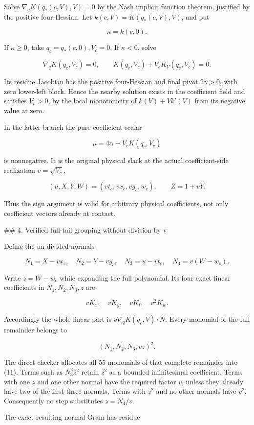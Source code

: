 Solve \(
\nabla_qK(q_*(c,V),V)=0
\) by the Nash implicit function theorem, justified by the positive
four-Hessian. Let \(k(c,V)=K(q_*(c,V),V)\), and put

\[
\kappa=k(c,0).
\]

If \(\kappa\ge0\), take \(q_c=q_*(c,0),V_c=0\). If \(\kappa<0\), solve

\[
\nabla_qK(q_c,V_c)=0,\qquad
K(q_c,V_c)+V_c K_V(q_c,V_c)=0.
\tag{8}
\]

Its residue Jacobian has the positive four-Hessian and final pivot
\(2\gamma>0\), with zero lower-left block. Hence the nearby solution
exists in the coefficient field and satisfies \(V_c>0\), by the local
monotonicity of \(k(V)+Vk'(V)\) from its negative value at zero.

In the latter branch the pure coefficient scalar

\[
\mu=4\alpha+V_cK(q_c,V_c)
\tag{9}
\]

is nonnegative. It is the original physical slack at the actual
coefficient-side realization \(v=\sqrt{V_c}\),

\[
(u,X,Y,W)=(v t_c,v x_c,v y_c,w_c),\qquad Z=1+vY.
\]

Thus the sign argument is valid for arbitrary physical coefficients, not
only coefficient vectors already at contact.

## 4. Verified full-tail grouping without division by v

Define the un-divided normals

\[
N_1=X-vx_c,\quad N_2=Y-vy_c,\quad N_3=u-vt_c,
\quad N_4=v(W-w_c).
\tag{10}
\]

Write \(z=W-w_c\) while expanding the full polynomial. Its four exact
linear coefficients in \(N_1,N_2,N_3,z\) are

\[
vK_x,\quad vK_y,\quad vK_t,\quad v^2K_w.
\]

Accordingly the whole linear part is \(v\nabla_qK(q_c,V)\cdot N\).
Every monomial of the full remainder belongs to

\[
(N_1,N_2,N_3,vz)^2.
\tag{11}
\]

The direct checker allocates all 55 monomials of that complete remainder
into (11). Terms such as \(N_3^2z^2\) retain \(z^2\) as a bounded
infinitesimal coefficient. Terms with one \(z\) and one other normal have
the required factor \(v\), unless they already have two of the first
three normals. Terms with \(z^2\) and no other normals have \(v^2\).
Consequently no step substitutes \(z=N_4/v\).

The exact resulting normal Gram has residue

